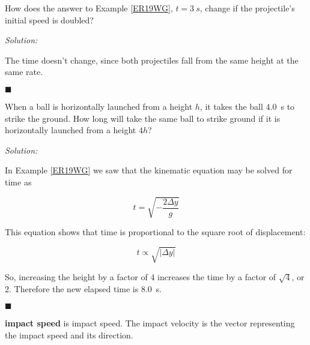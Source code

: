 \documentclass[dvipsnames]{article}
\begin{document}
\begin{example} \label{ADuHT8}
    How does the answer to Example \ref{ER19WG}, $t=\SI{3}{s}$, change if the projectile's initial speed is doubled?
\end{example}

\textit{Solution:}

The time doesn't change, since both projectiles fall from the same height at the same rate.

\hfill $\blacksquare$

\begin{example} \label{mT7mjd}
    When a ball is horizontally launched from a height $h$, it takes the ball \SI{4.0}{s} to strike the ground. How long will take the same ball to strike ground if it is horizontally launched from a height $4h$?
\end{example}

\textit{Solution:}

In Example \ref{ER19WG} we saw that the kinematic equation may be solved for time as

\begin{equation*}
    t = \sqrt{-\frac{2\Delta y}{g}}
\end{equation*}

This equation shows that time is proportional to the square root of displacement:

\begin{equation*}
    t \propto \sqrt{\left|\Delta y\right|}
\end{equation*}

So, increasing the height by a factor of 4 increases the time by a factor of $\sqrt{4}$, or 2. Therefore the new elapsed time is \SI{8.0}{s}.

\hfill $\blacksquare$

\textbf{\Gls{impact speed}} is \glsdesc{impact speed}. The impact velocity is the vector representing the impact speed and its direction. 

\begin{center}
\end{center}
\end{document}

